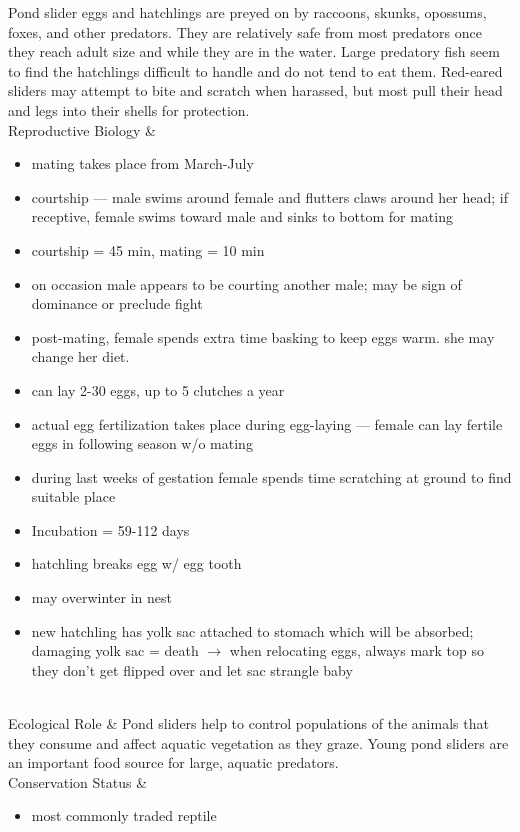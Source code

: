 \begin{center}
\begin{longtabu}
	Pond slider eggs and hatchlings are preyed on by raccoons, skunks, opossums, foxes, and other predators. They are relatively safe from most predators once they reach adult size and while they are in the water. Large predatory fish seem to find the hatchlings difficult to handle and do not tend to eat them. Red-eared sliders may attempt to bite and scratch when harassed, but most pull their head and legs into their shells for protection.
	\\
	\hline
	Reproductive Biology & 
	\begin{itemize}[noitemsep]
		\item mating takes place from March-July
		\item courtship --- male swims around female and flutters claws around her head; if receptive, female swims toward male and sinks to bottom for mating
		\item courtship = 45 min, mating = 10 min
		\item on occasion male appears to be courting another male; may be sign of dominance or preclude fight
		\item post-mating, female spends extra time basking to keep eggs warm. she may change her diet.
		\item can lay 2-30 eggs, up to 5 clutches a year
		\item actual egg fertilization takes place during egg-laying --- female can lay fertile eggs in following season w/o mating
		\item during last weeks of gestation female spends time scratching at ground to find suitable place
		\item Incubation = 59-112 days
		\item hatchling breaks egg w/ egg tooth
		\item may overwinter in nest
		\item new hatchling has yolk sac attached to stomach which will be absorbed; damaging yolk sac = death $\rightarrow$ when relocating eggs, always mark top so they don't get flipped over and let sac strangle baby
	\end{itemize}
	\\
	\hline
	Ecological Role &
	Pond sliders help to control populations of the animals that they consume and affect aquatic vegetation as they graze. Young pond sliders are an important food source for large, aquatic predators.
	\\
	\hline
	Conservation Status & 
	\begin{itemize}[noitemsep]
		\item most commonly traded reptile

\end{itemize}
\end{longtabu}
\end{center}
